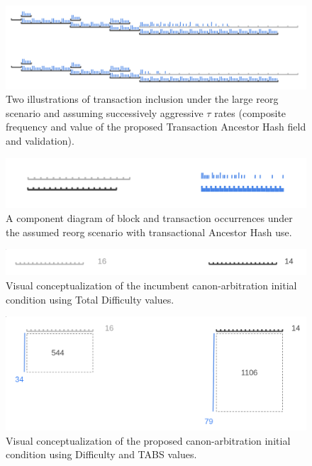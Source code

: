 \documentclass[11pt]{article}
\theoremstyle{plain}
\begin{document}
\begin{figure}[tph]
\centering
\includegraphics[width=1.0\textwidth]{vis_blocksegment_forking_reorg_anchash.png
}
\caption{Two illustrations of transaction inclusion under the large reorg
scenario and assuming successively aggressive $\tau$ rates (composite frequency
and value of the proposed Transaction Ancestor Hash field and validation).
}
\label{fig:blocksegment_forks_reorg_anchash}
\end{figure}

\begin{figure}[tph]
\centering
\includegraphics[width=1.0\textwidth]{vis_blocksegment_canonpref_abstract.png}
\caption{
  A component diagram of block and transaction occurrences under the assumed
reorg scenario with transactional Ancestor Hash use.
}
\label{fig:blocksegment_forks_canonpref_incumbent_ex}
\end{figure}

\begin{figure}[tph]
\centering
\includegraphics[width=1.0\textwidth]{vis_blocksegment_canonpref_incumbent_ex.png}
\caption{Visual conceptualization of the incumbent canon-arbitration
initial condition using Total Difficulty values.
}
\label{fig:blocksegment_forks_canonpref_incumbent_ex}
\end{figure}


\begin{figure}[tph]
\centering
\includegraphics[width=1.0\textwidth]{vis_blocksegment_canonpref_proposed_ex.png}
\caption{Visual conceptualization of the proposed canon-arbitration initial
condition using Difficulty and TABS values.
}
\label{fig:blocksegment_forks_canonpref_proposed_ex}
\end{figure}
\end{document}
